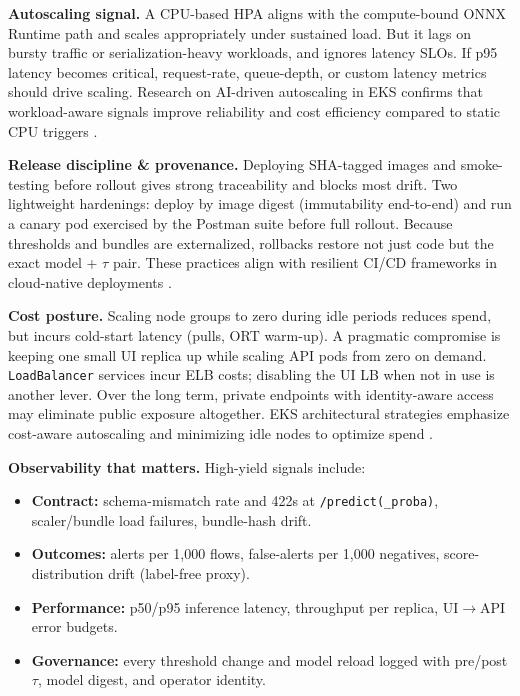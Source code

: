 \documentclass{article}
\begin{document}
\textbf{Autoscaling signal.} A CPU-based HPA aligns with the compute-bound ONNX Runtime path and scales appropriately under sustained load. But it lags on bursty traffic or serialization-heavy workloads, and ignores latency SLOs. If p95 latency becomes critical, request-rate, queue-depth, or custom latency metrics should drive scaling. Research on AI-driven autoscaling in EKS confirms that workload-aware signals improve reliability and cost efficiency compared to static CPU triggers \cite{thota2023}.

\textbf{Release discipline \& provenance.} Deploying SHA-tagged images and smoke-testing before rollout gives strong traceability and blocks most drift. Two lightweight hardenings: deploy by image digest (immutability end-to-end) and run a canary pod exercised by the Postman suite before full rollout. Because thresholds and bundles are externalized, rollbacks restore not just code but the exact model + $\tau$ pair. These practices align with resilient CI/CD frameworks in cloud-native deployments \cite{ashtagi2025}.

\textbf{Cost posture.} Scaling node groups to zero during idle periods reduces spend, but incurs cold-start latency (pulls, ORT warm-up). A pragmatic compromise is keeping one small UI replica up while scaling API pods from zero on demand. \texttt{LoadBalancer} services incur ELB costs; disabling the UI LB when not in use is another lever. Over the long term, private endpoints with identity-aware access may eliminate public exposure altogether. EKS architectural strategies emphasize cost-aware autoscaling and minimizing idle nodes to optimize spend \cite{mohammed2025}.

\textbf{Observability that matters.} High-yield signals include:
\begin{itemize}
    \item \textbf{Contract:} schema-mismatch rate and 422s at \texttt{/predict(\_proba)}, scaler/bundle load failures, bundle-hash drift.
    \item \textbf{Outcomes:} alerts per 1,000 flows, false-alerts per 1,000 negatives, score-distribution drift (label-free proxy).
    \item \textbf{Performance:} p50/p95 inference latency, throughput per replica, UI$\to$API error budgets.
    \item \textbf{Governance:} every threshold change and model reload logged with pre/post $\tau$, model digest, and operator identity.
\end{itemize}
\end{document}

